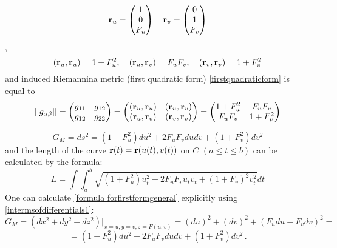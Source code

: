 \documentclass[12pt]{article}
\theoremstyle{theorem}
\numberwithin{equation}{section}
\begin{document}
  \begin{equation}\label{c}
  {\bf r}_u=\begin{pmatrix}
        1\\
        0\\
        F_u\\
   \end{pmatrix}
\quad
  {\bf r}_v=\begin{pmatrix}
        0\\
        1\\
        F_v\\
   \end{pmatrix}
 \end{equation},
            $$
     ({\bf r}_u,{\bf r}_u)=1+F_u^2,\quad
     ({\bf r}_u,{\bf r}_v)=F_uF_v,\quad
     ({\bf r}_v,{\bf r}_v)=1+F_v^2
            $$
and induced Riemannina metric (first quadratic form) \eqref{firstquadraticform} is equal to
\begin{equation}\label{formula forfirstform}
   ||g_{\alpha\beta}||=
\begin{pmatrix}
   g_{11} & g_{12} \\
   g_{12}& g_{22} \\
   \end{pmatrix}=
   \begin{pmatrix}
   ({\bf r}_u,{\bf r}_u) & ({\bf r}_u,{\bf r}_v) \\
   ({\bf r}_u,{\bf r}_v) & ({\bf r}_v,{\bf r}_v) \\
   \end{pmatrix}=   \begin{pmatrix}
   1+F_u^2 & F_uF_v \\
   F_uF_v& 1+F_v^2 \\
   \end{pmatrix}
\end{equation}

\begin{equation}\label{formula forfirstformgeneral}
   G_M=ds^2=(1+F_u^2)du^2+2F_uF_vdudv+(1+F_v^2)dv^2
\end{equation}
  and the length of the curve ${\bf r}(t)={\bf r} (u(t), v(t))$ on $C$  $(a\leq t\leq b)$
  can be calculated by the formula:
               \begin{equation*}
             L=\int
             \int_a^b\sqrt{(1+F_u^2)u_t^2+2F_uF_vu_tv_t+(1+F_v)^2v^2_t}dt
               \end{equation*}
One can calculate \eqref{formula forfirstformgeneral} explicitly using \eqref{intermsofdifferentials1}:
                     $$
                                    G_M=\left(dx^2+dy^2+dz^2\right)\big\vert_{x=u,y=v,z=F(u,v)}=
               (du)^2+(dv)^2+(F_udu+F_vdv)^2=
                     $$
               \begin{equation}\label{formula forfirstformgeneral}
=(1+F_u^2)du^2+2F_uF_vdudv+(1+F_v^2)dv^2\,.
               \end{equation}
\end{document}
